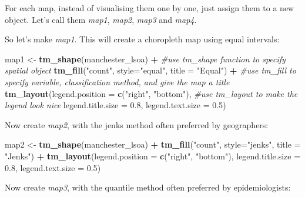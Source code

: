 \documentclass[]{book}
\newenvironment{Shaded}{\begin{snugshade}}{\end{snugshade}}
\newcommand{\CommentTok}[1]{\textcolor[rgb]{0.56,0.35,0.01}{\textit{#1}}}
\newcommand{\DataTypeTok}[1]{\textcolor[rgb]{0.13,0.29,0.53}{#1}}
\newcommand{\FloatTok}[1]{\textcolor[rgb]{0.00,0.00,0.81}{#1}}
\newcommand{\KeywordTok}[1]{\textcolor[rgb]{0.13,0.29,0.53}{\textbf{#1}}}
\newcommand{\NormalTok}[1]{#1}
\newcommand{\OperatorTok}[1]{\textcolor[rgb]{0.81,0.36,0.00}{\textbf{#1}}}
\newcommand{\StringTok}[1]{\textcolor[rgb]{0.31,0.60,0.02}{#1}}
\begin{document}
For each map, instead of visualising them one by one, just assign them to a new object. Let's call them \emph{map1}, \emph{map2}, \emph{map3} and \emph{map4}.

So let's make \emph{map1}. This will create a choropleth map using equal intervals:

\begin{Shaded}
\begin{Highlighting}[]
\NormalTok{map1 <-}\StringTok{ }\KeywordTok{tm_shape}\NormalTok{(manchester_lsoa) }\OperatorTok{+}\StringTok{                   }\CommentTok{#use tm_shape function to specify spatial object}
\StringTok{  }\KeywordTok{tm_fill}\NormalTok{(}\StringTok{"count"}\NormalTok{, }\DataTypeTok{style=}\StringTok{"equal"}\NormalTok{, }\DataTypeTok{title =} \StringTok{"Equal"}\NormalTok{) }\OperatorTok{+}\StringTok{  }\CommentTok{#use tm_fill to specify variable, classification method, and give the map a title}
\StringTok{  }\KeywordTok{tm_layout}\NormalTok{(}\DataTypeTok{legend.position =} \KeywordTok{c}\NormalTok{(}\StringTok{"right"}\NormalTok{, }\StringTok{"bottom"}\NormalTok{),   }\CommentTok{#use tm_layout to make the legend look nice}
            \DataTypeTok{legend.title.size =} \FloatTok{0.8}\NormalTok{,}
            \DataTypeTok{legend.text.size =} \FloatTok{0.5}\NormalTok{)}
\end{Highlighting}
\end{Shaded}

Now create \emph{map2}, with the jenks method often preferred by geographers:

\begin{Shaded}
\begin{Highlighting}[]
\NormalTok{map2 <-}\StringTok{ }\KeywordTok{tm_shape}\NormalTok{(manchester_lsoa) }\OperatorTok{+}\StringTok{ }
\StringTok{  }\KeywordTok{tm_fill}\NormalTok{(}\StringTok{"count"}\NormalTok{, }\DataTypeTok{style=}\StringTok{"jenks"}\NormalTok{, }\DataTypeTok{title =} \StringTok{"Jenks"}\NormalTok{) }\OperatorTok{+}
\StringTok{  }\KeywordTok{tm_layout}\NormalTok{(}\DataTypeTok{legend.position =} \KeywordTok{c}\NormalTok{(}\StringTok{"right"}\NormalTok{, }\StringTok{"bottom"}\NormalTok{), }
            \DataTypeTok{legend.title.size =} \FloatTok{0.8}\NormalTok{,}
            \DataTypeTok{legend.text.size =} \FloatTok{0.5}\NormalTok{)}
\end{Highlighting}
\end{Shaded}

Now create \emph{map3}, with the quantile method often preferred by epidemiologists:
\end{document}

